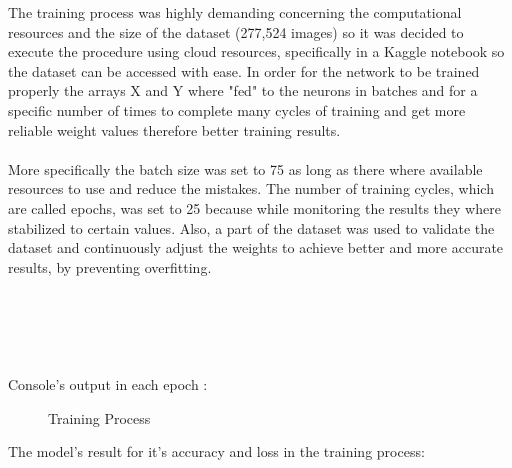 The training process was highly demanding concerning the computational resources and the size of the dataset (277,524 images) so it was decided to execute the procedure using cloud resources, specifically in a Kaggle notebook so the dataset can be accessed with ease. In order for the network to be trained properly the arrays X and Y where "fed" to the neurons in batches and for a specific number of times to complete many cycles of training and get more reliable weight values therefore better training results.\\~\\ More specifically the batch size was set to 75 as long as there where available resources to use and reduce the mistakes. The number of training cycles, which are called epochs, was set to 25 because while monitoring the results they where stabilized to certain values. Also, a part of the dataset was used to validate the dataset and continuously adjust the weights to achieve better and more accurate results, by preventing overfitting.\\~\\~\\~\\~\\~\\
Console's output in each epoch : 
\begin{figure}[H]
  \centering
  \hfill
  \caption{Training Process}
\end{figure}
The model's result for it's accuracy and loss in the training process:
